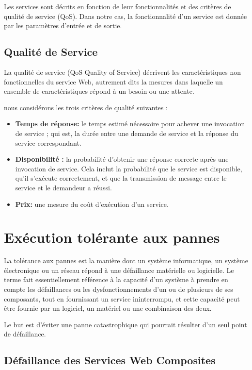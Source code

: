 Les services sont décrits en fonction de leur fonctionnalités et des critères de qualité de service (QoS). Dans notre cas, la fonctionnalité d’un service est donnée par les paramètres d’entrée et de sortie.

\subsection { Qualité de Service }

La qualité de service (QoS Quality of Service) décrivent les caractéristiques non fonctionnelles du service Web, autrement dits la mesures dans laquelle un ensemble de caractéristiques répond à un besoin ou une attente.

nous considérons les trois critères de qualité suivantes \cite{2} :
\begin{itemize}
    \item \textbf{Temps de réponse:} le temps estimé nécessaire pour achever une invocation de service ; qui est, la durée entre une demande de service et la réponse du service correspondant.
    \item \textbf{Disponibilité :} la probabilité d’obtenir une réponse correcte après une invocation de service. Cela inclut la probabilité que le service est disponible, qu’il s’exécute correctement, et que la transmission de message entre le service et le demandeur a réussi.
    \item \textbf{ Prix: } une mesure du coût d’exécution d’un service.
\end{itemize}



\section{Exécution tolérante aux pannes}

La tolérance aux pannes est la manière dont un système informatique, un système électronique ou un réseau répond à une défaillance matérielle ou logicielle. Le terme fait essentiellement référence à la capacité d'un système à prendre en compte les défaillances ou les dysfonctionnements d’un ou de plusieurs de ses composants, tout en fournissant un service ininterrompu, et cette capacité peut être fournie par un logiciel, un matériel ou une combinaison des deux.

Le but est d'éviter une panne catastrophique qui pourrait résulter d'un seul point de défaillance. 

\subsection{Défaillance des Services Web Composites}

